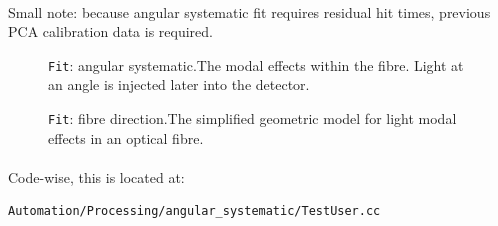 \documentclass[12pt]{article}
\begin{document}
\paragraph{}
Small note: because angular systematic fit requires residual hit times, previous PCA calibration data is required.

\begin{figure}
\centering
\noindent{}
  \caption{\centering \texttt{Fit}: angular systematic.\hspace{\textwidth}The modal effects within the fibre. Light at an angle is injected later into the detector.}
  \label{fig:as1}
\end{figure}

\begin{figure}
\centering
\noindent{}
  \caption{\centering \texttt{Fit}: fibre direction.\hspace{\textwidth}The simplified geometric model for light modal effects in an optical fibre.}
  \label{fig:as2}
\end{figure}

\paragraph{}
Code-wise, this is located at:
\begin{lstlisting}
Automation/Processing/angular_systematic/TestUser.cc
\end{lstlisting}
\end{document}
